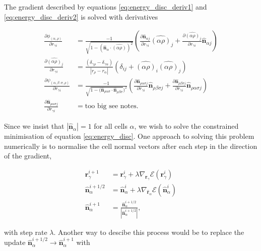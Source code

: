 \documentclass[draft]{article}
\newcommand{\e}{\mathcal{E}}
\newcommand{\bh}[1]{\hat{\bm{#1}}}
\newcommand{\wh}[1]{\widehat{#1}}
\begin{document}
The gradient described by equations \ref{eq:energy_disc_deriv1} and \ref{eq:energy_disc_deriv2} is solved with derivatives

\begin{align*}
    \frac{\partial \phi_{(\alpha,\rho)}}{\partial r_{\gamma i}} &= \frac{-1}{\sqrt{1 - (\bh{n}_\alpha \cdot \wh{(\alpha\rho)})^2}} \left(\frac{\partial \bh{n}_{\alpha j}}{\partial r_{\gamma i}} \wh{(\alpha\rho)}_j + \frac{\partial \wh{(\alpha\rho)}_j}{\partial r_{\gamma i}} \bh{n}_{\alpha j} \right) \\
    \frac{\partial \wh{(\alpha\rho)}_j}{\partial r_{\gamma i}} &= \frac{(\delta_{\gamma\rho} - \delta_{\gamma\alpha})}{|r_\rho - r_\alpha|} \left( \delta_{ij} + \wh{(\alpha\rho)}_i\wh{(\alpha\rho)}_j \right) \\
    \frac{\partial \psi_{(\alpha, \beta: \sigma, \rho)}}{\partial r_{\gamma i}} &= \frac{-1}{\sqrt{1 - (\bh{n}_{\rho\alpha\sigma} \cdot \bh{n}_{\rho\beta\sigma}})^2} \left(\frac{\partial \bh{n}_{\rho\alpha\sigma j}}{\partial r_{\gamma i}} \bh{n}_{\rho\beta\sigma j} + \frac{\partial \bh{n}_{\rho\beta\sigma j}}{\partial r_{\gamma i}} \bh{n}_{\rho\alpha\sigma j} \right) \\
    \frac{\partial \hat{\bm{n}}_{\rho\alpha\sigma j}}{\partial r_{\gamma i}} &= \text{too big see notes}.
\end{align*}

Since we insist that $|\bh{n}_\alpha| = 1$ for all cells $\alpha$, we wish to solve the constrained minimisation of equation \ref{eq:energy_disc}. One approach to solving this problem numerically is to normalise the cell normal vectors after each step in the direction of the gradient,

\begin{align*}
	\bm{r}_{\gamma}^{i+1} &= \bm{r}_\gamma^i + \lambda \nabla_{\bm{r}_\gamma} \e (\bm{r}_\gamma^i) \\
	\bh{n}_\alpha^{i+1/2} &= \bh{n}_\alpha^i + \lambda \nabla_{\bh{r}_\alpha} \e (\bh{n}_\alpha^i) \\
	\bh{n}_\alpha^{i+1} &= \frac{\bh{n}_\alpha^{i+1/2}}{\left|\bh{n}_\alpha^{i+1/2}\right|},
\end{align*}

\noindent with step rate $\lambda$. Another way to descibe this process would be to replace the update $\bh{n}_\alpha^{i+1/2} \rightarrow \bh{n}_\alpha^{i+1}$ with 
\end{document}
